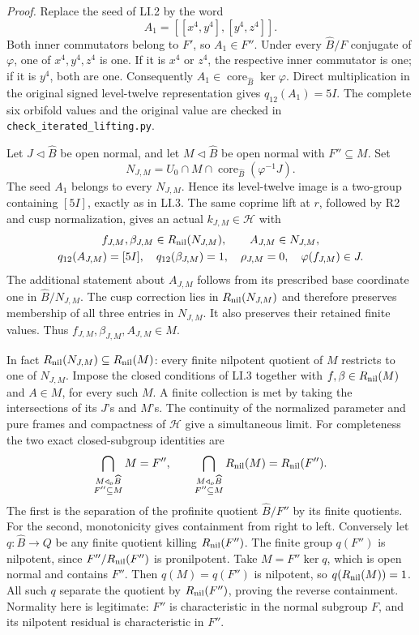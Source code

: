 \emph{Proof.}
Replace the seed of LI.2 by the word
\[
                    A_1=[[x^4,y^4],[y^4,z^4]].
\]
Both inner commutators belong to $F'$, so $A_1\in F''$.
Under every $\widehat B/F$ conjugate of $\varphi$, one of
$x^4,y^4,z^4$ is one. If it is $x^4$ or $z^4$, the respective
inner commutator is one; if it is $y^4$, both are one.
Consequently $A_1\in\operatorname{core}_{\widehat B}\ker\varphi$.
Direct multiplication in the original signed level-twelve
representation gives $q_{12}(A_1)=5I$. The complete six
orbifold values and the original value are checked in
\texttt{check\_iterated\_lifting.py}.

Let $J\triangleleft\widehat B$ be open normal, and let
$M\triangleleft\widehat B$ be open normal with $F''\subseteq M$.
Set
\[
 N_{J,M}=U_0\cap M\cap
       \operatorname{core}_{\widehat B}(\varphi^{-1}J).
\]
The seed $A_1$ belongs to every $N_{J,M}$. Hence its level-twelve
image is a two-group containing $[5I]$, exactly as in LI.3.
The same coprime lift at $r$, followed by R2 and cusp
normalization, gives an actual $k_{J,M}\in\mathcal H$ with
\[
 \begin{gathered}
 f_{J,M},\beta_{J,M}\in R_{\rm nil}(N_{J,M}),
 \qquad A_{J,M}\in N_{J,M},\\
 q_{12}(A_{J,M})=[5I],\quad q_{12}(\beta_{J,M})=1,
 \quad\rho_{J,M}=0,\quad\varphi(f_{J,M})\in J.
 \end{gathered}
\]
The additional statement about $A_{J,M}$ follows from its
prescribed base coordinate one in $\widehat B/N_{J,M}$.
The cusp correction lies in $R_{\rm nil}(N_{J,M})$ and
therefore preserves membership of all three entries in
$N_{J,M}$. It also preserves their retained finite values.
Thus $f_{J,M},\beta_{J,M},A_{J,M}\in M$.

In fact $R_{\rm nil}(N_{J,M})\subseteq R_{\rm nil}(M)$:
every finite nilpotent quotient of $M$ restricts to one of
$N_{J,M}$. Impose the closed conditions of LI.3 together with
$f,\beta\in R_{\rm nil}(M)$ and $A\in M$, for every such $M$.
A finite collection is
met by taking the intersections of its $J$'s and $M$'s.
The continuity of the normalized parameter and pure frames
and compactness of $\mathcal H$ give a simultaneous limit.
For completeness the two exact closed-subgroup identities are
\[
 \bigcap_{\substack{M\triangleleft_o\widehat B\\F''\subseteq M}}M=F'',
 \qquad
 \bigcap_{\substack{M\triangleleft_o\widehat B\\F''\subseteq M}}
          R_{\rm nil}(M)=R_{\rm nil}(F'').
\]
The first is the separation of the profinite quotient
$\widehat B/F''$ by its finite quotients. For the second,
monotonicity gives containment from right to left. Conversely
let $q:\widehat B\to Q$ be any finite quotient killing
$R_{\rm nil}(F'')$. The finite group $q(F'')$ is nilpotent,
since $F''/R_{\rm nil}(F'')$ is pronilpotent.
Take $M=F''\ker q$, which is open normal and contains $F''$.
Then $q(M)=q(F'')$ is nilpotent, so $q(R_{\rm nil}(M))=1$.
All such $q$ separate the quotient by $R_{\rm nil}(F'')$,
proving the reverse containment. Normality here is legitimate:
$F''$ is characteristic in the normal subgroup $F$, and its
nilpotent residual is characteristic in $F''$.

